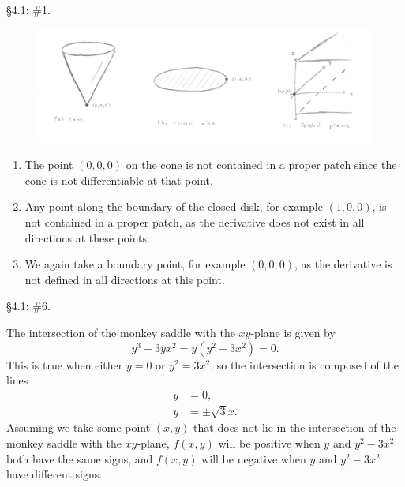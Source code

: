 \documentclass[10pt]{report}
\begin{document}

\begin{exer}[]
\S 4.1: \#1.
\end{exer}
\begin{figure}[H]
	\centering
	\includegraphics[scale=0.4]{fig/4.1.png}
\end{figure}

\begin{enumerate}
	\item The point $(0,0,0)$ on the cone is not contained in a proper patch since the cone is not differentiable at that point.
	\item Any point along the boundary of the closed disk, for example $(1,0,0)$, is not contained in a proper patch, as the derivative does not exist in all directions at these points.
	\item We again take a boundary point, for example $(0,0,0)$, as the derivative is not defined in all directions at this point.
\end{enumerate}

\begin{exer}[]
\S 4.1: \#6.
\end{exer}
The intersection of the monkey saddle with the $xy$-plane is given by
\[
	y^3-3yx^2= y(y^2-3x^2) = 0.
\] This is true when either $y=0$ or $y^2 = 3x^2$, so the intersection is composed of the lines
\begin{align*}
	y &= 0, \\
	y &= \pm \sqrt{3}x. 
\end{align*}
Assuming we take some point $(x,y)$ that does not lie in the intersection of the monkey saddle with the $xy$-plane, $f(x,y)$ will be positive when $y$ and $y^2-3x^2$ both have the same signs, and $f(x,y)$ will be negative when $y$ and $y^2-3x^2$ have different signs.
\end{document}
